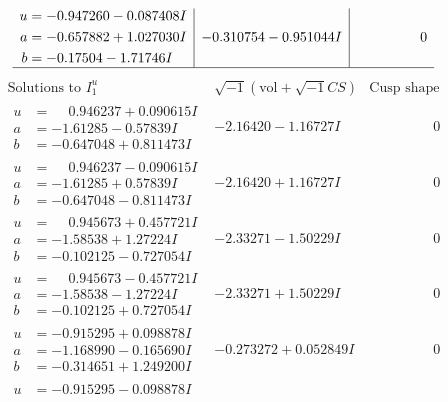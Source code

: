 \documentclass[1p]{elsarticle_modified}
\theoremstyle{definition}
\newcommand{\I}{\sqrt{-1}}
\begin{document}
$$\begin{array}{c|c|c}
\begin{aligned}
u &= -0.947260 - 0.087408 I \\
a &= -0.657882 + 1.027030 I \\
b &= -0.17504 - 1.71746 I\end{aligned}
 & -0.310754 - 0.951044 I & \phantom{-0.000000 } 0\\
 \hline 
 \end{array}$$\newpage$$\begin{array}{c|c|c}  
\text{Solutions to }I^u_{1}& \I (\text{vol} + \sqrt{-1}CS) & \text{Cusp shape}\\
 \hline 
\begin{aligned}
u &= \phantom{-}0.946237 + 0.090615 I \\
a &= -1.61285 - 0.57839 I \\
b &= -0.647048 + 0.811473 I\end{aligned}
 & -2.16420 - 1.16727 I & \phantom{-0.000000 } 0 \\ \hline\begin{aligned}
u &= \phantom{-}0.946237 - 0.090615 I \\
a &= -1.61285 + 0.57839 I \\
b &= -0.647048 - 0.811473 I\end{aligned}
 & -2.16420 + 1.16727 I & \phantom{-0.000000 } 0 \\ \hline\begin{aligned}
u &= \phantom{-}0.945673 + 0.457721 I \\
a &= -1.58538 + 1.27224 I \\
b &= -0.102125 - 0.727054 I\end{aligned}
 & -2.33271 - 1.50229 I & \phantom{-0.000000 } 0 \\ \hline\begin{aligned}
u &= \phantom{-}0.945673 - 0.457721 I \\
a &= -1.58538 - 1.27224 I \\
b &= -0.102125 + 0.727054 I\end{aligned}
 & -2.33271 + 1.50229 I & \phantom{-0.000000 } 0 \\ \hline\begin{aligned}
u &= -0.915295 + 0.098878 I \\
a &= -1.168990 - 0.165690 I \\
b &= -0.314651 + 1.249200 I\end{aligned}
 & -0.273272 + 0.052849 I & \phantom{-0.000000 } 0 \\ \hline\begin{aligned}
u &= -0.915295 - 0.098878 I \\

\end{aligned}
\end{array}$$
\end{document}
